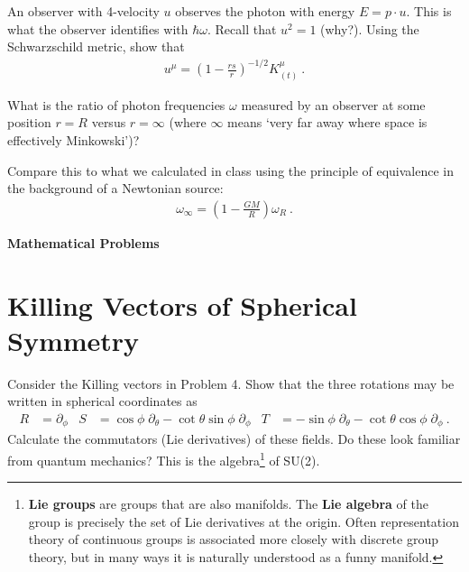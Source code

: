 \documentclass[12pt]{article}
\numberwithin{equation}{section}    %
\begin{document}
An observer with 4-velocity $u$ observes the photon with energy $E= p\cdot u$. This is what the observer identifies with $\hbar \omega$. Recall that $u^2 = 1$ (why?). Using the Schwarzschild metric, show that
\begin{align}
u^\mu = \left(1-\frac{rs}{r}\right)^{-1/2} K_{(t)}^\mu\ .
\end{align}

What is the ratio of photon frequencies $\omega$ measured by an observer at some position $r=R$ versus $r=\infty$ (where $\infty$  means `very far away where space is effectively Minkowski')?

Compare this to what we calculated in class using the principle of equivalence in the background of a Newtonian source:
\begin{align}
	\omega_\infty = \left(1-\frac{GM}{R}\right)\omega_R \ .
\end{align}




\vspace{2em}
{\Large\textbf{\textsf{Mathematical Problems}}}


\section{Killing Vectors of Spherical Symmetry}

Consider the Killing vectors in Problem 4. Show that the three rotations may be written in spherical coordinates as
\begin{align}
R &= \partial_\phi
&
S &= \cos\phi \; \partial_\theta - \cot \theta \sin \phi\; \partial_\phi
&
T &= -\sin\phi \; \partial_\theta - \cot\theta\cos\phi \; \partial_\phi \ .	
\end{align}
Calculate the commutators (Lie derivatives) of these fields. Do these look familiar from quantum mechanics? This is the algebra\footnote{\textbf{Lie groups} are groups that are also manifolds. The \textbf{Lie algebra} of the group is precisely the set of Lie derivatives at the origin. Often representation theory of continuous groups is associated more closely with discrete group theory, but in many ways it is naturally understood as a funny manifold.} of SU(2).
\end{document}
